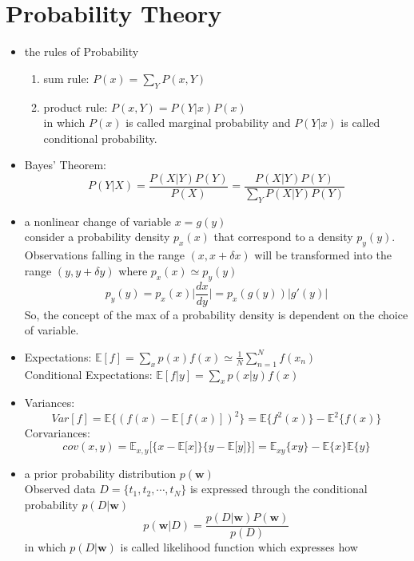 \documentclass[12pt, a4paper]{article}
\begin{document}
    \section{Probability Theory}
    \begin{itemize}
        \item the rules of Probability
        \begin{enumerate}
            \item sum rule: $P(x)=\sum_YP(x,Y)$
            \item product rule: $P(x,Y)=P(Y|x)P(x)$\\
            in which $P(x)$ is called marginal probability and $P(Y|x)$ is 
            called conditional probability.
        \end{enumerate}
        \item Bayes' Theorem:
        \[
            P(Y|X)=\frac{P(X|Y)P(Y)}{P(X)}=\frac{P(X|Y)P(Y)}{\sum_Y{P(X|Y)P(Y)}}
            \]
        \item a nonlinear change of variable $x=g(y)$\\
        consider a probability density $p_x(x)$ that correspond to a density $p_y(y)$.
        Observations falling in the range $(x,x+\delta x)$ will be transformed into the
        range $(y, y+\delta y)$ where $p_x(x)\simeq p_y(y)$
        \[
            p_y(y)=p_x(x)\Big\vert\frac{dx}{dy}\Big\vert=p_x(g(y))\vert g'(y)\vert
            \]
        So, the concept of the max of a probability density is dependent on the choice
        of variable.
        \item Expectations: $\mathbb{E}[f]=\sum_xp(x)f(x)\simeq \frac{1}{N}\sum_{n=1}
        ^{N}f(x_n)$\\
        Conditional Expectations: $\mathbb{E}[f|y]=\sum_xp(x|y)f(x)$
        \item Variances: \[Var[f]=\mathbb{E}\{(f(x)-\mathbb{E}[f(x)])^2\}=
        \mathbb{E}\{f^2(x)\}-\mathbb{E}^2\{f(x)\}\]
        Corvariances: \[cov(x,y)=\mathbb{E}_{x,y}\lbrack\{x-\mathbb{E}\lbrack x\rbrack\}
        \{y-\mathbb{E}\lbrack y\rbrack\}\rbrack=\mathbb{E}_{xy}\lbrace xy\rbrace-
        \mathbb{E}\lbrace x\rbrace\mathbb{E}\lbrace y\rbrace\]
        \item a prior probability distribution $p(\bm{w})$\\
        Observed data $D=\{t_1,t_2,\cdots,t_N\}$ is expressed through the conditional
        probability $p(D|\bm{w})$
        \[
            p(\bm{w}|D)=\frac{p(D|\bm{w})P(\bm{w})}{p(D)}
            \]
        in which $p(D|\bm{w})$ is called likelihood function which expresses how 

\end{itemize}
\end{document}
